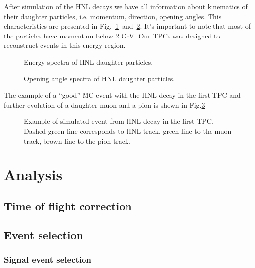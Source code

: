 \documentclass[../main.tex]{subfiles}
\begin{document}
After simulation of the HNL decays we have all information about kinematics of their daughter particles, i.e. momentum, direction, opening angles. This characteristics are presented in Fig.~\ref{fig:HNL:secondaryE}~and~\ref{fig:HNL:secondaryCos}. It's important to note that most of the particles have momentum below 2 GeV. Our TPCs was designed to reconstruct events in this energy region.
\begin{figure}[!ht]
\begin{center}
    \caption{Energy spectra of HNL daughter particles.}
    \label{fig:HNL:secondaryE}
\end{center}
\end{figure}
\begin{figure}[!ht]
\begin{center}
    \caption{Opening angle spectra of HNL daughter particles.}
    \label{fig:HNL:secondaryCos}
\end{center}
\end{figure}
The example of a ``good'' MC event with the HNL decay in the first TPC and further evolution of a daughter muon and a pion is shown in Fig.\ref{fig:HNL:event}
\begin{figure}[!ht]
    \caption{Example of simulated event from HNL decay in the first TPC. Dashed green line corresponds to HNL track, green line to the muon track, brown line to the pion track.}
    \label{fig:HNL:event}
\end{figure}

\begin{comment}


\end{comment}


\chapter{Analysis}
\label{ch:HNL:ana}

\section{Time of flight correction}
\label{sec:HNL:tof_corr}
\section{Event selection}
\label{sec:HNL:sel}
\subsection{Signal event selection}
\end{document}
